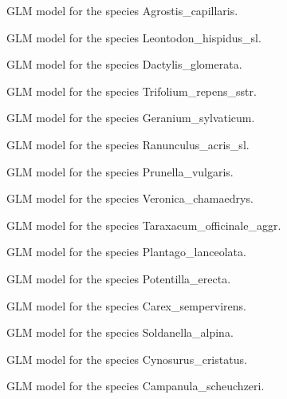 \documentclass[a4paper]{book}
\begin{document}
\begin{Format}
\begin{description}
\item[] 
\item[] 
\item[] 
\item[] 
\item[] 
\item[] 
\item[] 
\item[] 
\item[] 
\item[] GLM model for the species Agrostis\_capillaris.
\item[] GLM model for the species Leontodon\_hispidus\_sl.
\item[] GLM model for the species Dactylis\_glomerata.
\item[] GLM model for the species Trifolium\_repens\_sstr.
\item[] GLM model for the species Geranium\_sylvaticum.
\item[] GLM model for the species Ranunculus\_acris\_sl.
\item[] GLM model for the species Prunella\_vulgaris.
\item[] GLM model for the species Veronica\_chamaedrys.
\item[] GLM model for the species Taraxacum\_officinale\_aggr.
\item[] GLM model for the species Plantago\_lanceolata.
\item[] GLM model for the species Potentilla\_erecta.
\item[] GLM model for the species Carex\_sempervirens.
\item[] GLM model for the species Soldanella\_alpina.
\item[] GLM model for the species Cynosurus\_cristatus.
\item[] GLM model for the species Campanula\_scheuchzeri.

\end{description}
\end{Format}
\end{document}
